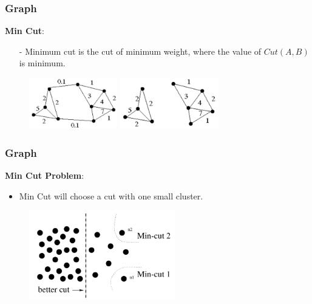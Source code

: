 \documentclass[notheorems,mathserif,table,compress]{beamer}  %
\begin{document}
\begin{frame}
    \frametitle{Graph}
   \textbf{\Large Min Cut}:
\begin{itemize}
	\item[-] Minimum cut is the cut of minimum weight, where the value of $Cut(A,B)$ is minimum.\newline
\end{itemize}
    \begin{figure}
	\begin{minipage}[c]{0.4\textwidth}
	\centering
	\includegraphics[width=1.5in]{mincut1}
	\end{minipage}
	\begin{minipage}[c]{0.4\textwidth}
	\centering
	\includegraphics[width=1.7in]{mincut2}
	\end{minipage}
    \end{figure}
\end{frame}
   
\begin{frame}
    \frametitle{Graph}
    \textbf{\Large Min Cut Problem}:\\
        \begin{itemize}
	\item Min Cut will choose a cut with one small cluster.
	\end{itemize}
    \begin{figure}[!ht]
    \centering
    \includegraphics[width=2.5in]{min_cut}
    \end{figure}
\end{frame}
\end{document}
